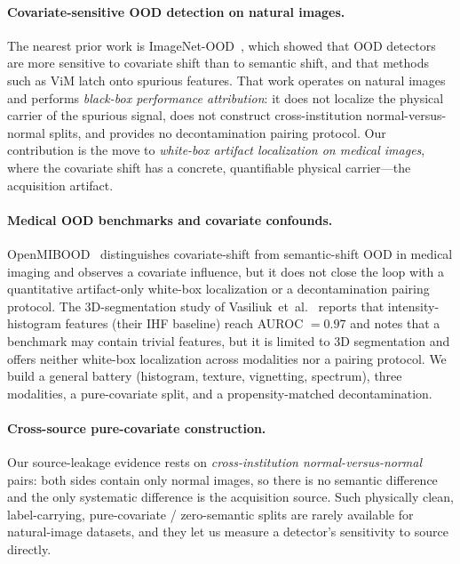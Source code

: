 \documentclass{article}
\begin{document}
\paragraph{Covariate-sensitive OOD detection on natural images.} The nearest
prior work is ImageNet-OOD~\citep{yang2024imagenetood}, which showed that OOD
detectors are more sensitive to covariate shift than to semantic shift, and that
methods such as ViM latch onto spurious features. That work operates on natural
images and performs \emph{black-box performance attribution}: it does not
localize the physical carrier of the spurious signal, does not construct
cross-institution normal-versus-normal splits, and provides no decontamination
pairing protocol. Our contribution is the move to \emph{white-box artifact
localization on medical images}, where the covariate shift has a concrete,
quantifiable physical carrier---the acquisition artifact.

\paragraph{Medical OOD benchmarks and covariate confounds.}
OpenMIBOOD~\citep{gutbrod2025openmibood} distinguishes covariate-shift from
semantic-shift OOD in medical imaging and observes a covariate influence, but it
does not close the loop with a quantitative artifact-only white-box localization
or a decontamination pairing protocol. The 3D-segmentation study of
Vasiliuk~et~al.~\citep{vasiliuk2023limitations} reports that intensity-histogram
features (their IHF baseline) reach AUROC $=0.97$ and notes that a benchmark may
contain trivial features, but it is limited to 3D segmentation and offers
neither white-box localization across modalities nor a pairing protocol. We
build a general battery (histogram, texture, vignetting, spectrum), three
modalities, a pure-covariate split, and a propensity-matched decontamination.

\paragraph{Cross-source pure-covariate construction.} Our source-leakage
evidence rests on \emph{cross-institution normal-versus-normal} pairs: both
sides contain only normal images, so there is no semantic difference and the
only systematic difference is the acquisition source. Such physically clean,
label-carrying, pure-covariate / zero-semantic splits are rarely available for
natural-image datasets, and they let us measure a detector's sensitivity to
source directly.
\end{document}
